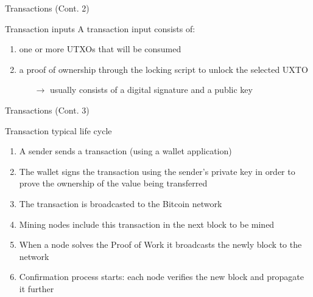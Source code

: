 \documentclass{beamer}
\begin{document}
  \begin{frame}{Transactions (Cont. 2)}
    \begin{block}{Transaction inputs}
      A transaction input consists of: \pause
      \begin{enumerate}
        \item one or more UTXOs that will be consumed \pause
        \item a proof of ownership through the locking script to unlock the selected UXTO \pause
        \begin{itemize}
          \item[$\rightarrow$] usually consists of a digital signature and a public key
        \end{itemize}
      \end{enumerate}
    \end{block}
  \end{frame}





  \begin{frame}{Transactions (Cont. 3)}
    \begin{block}{Transaction typical life cycle}
      \begin{enumerate}
        \item A sender sends a transaction (using a wallet application) \pause
        \item The wallet signs the transaction using the sender’s private key in order
        to prove the ownership of the value being transferred \pause
        \item The transaction is broadcasted to the Bitcoin network \pause
        \item Mining nodes include this transaction in the next block to be mined \pause
        \item When a node solves the Proof of Work it broadcasts the
        newly block to the network \pause
        \item Confirmation process starts: each node verifies the new block and
        propagate it further
      \end{enumerate}
    \end{block}
  \end{frame}
\end{document}
